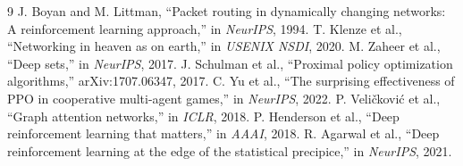 \documentclass[conference]{IEEEtran}
\begin{document}
\begin{thebibliography}{9}
 J. Boyan and M. Littman, ``Packet routing in dynamically changing networks: A reinforcement learning approach,'' in \emph{NeurIPS}, 1994.
 T. Klenze et al., ``Networking in heaven as on earth,'' in \emph{USENIX NSDI}, 2020.
 M. Zaheer et al., ``Deep sets,'' in \emph{NeurIPS}, 2017.
 J. Schulman et al., ``Proximal policy optimization algorithms,'' arXiv:1707.06347, 2017.
 C. Yu et al., ``The surprising effectiveness of PPO in cooperative multi-agent games,'' in \emph{NeurIPS}, 2022.
 P. Veli\v{c}kovi\'c et al., ``Graph attention networks,'' in \emph{ICLR}, 2018.
 P. Henderson et al., ``Deep reinforcement learning that matters,'' in \emph{AAAI}, 2018.
 R. Agarwal et al., ``Deep reinforcement learning at the edge of the statistical precipice,'' in \emph{NeurIPS}, 2021.
\end{thebibliography}
\end{document}
